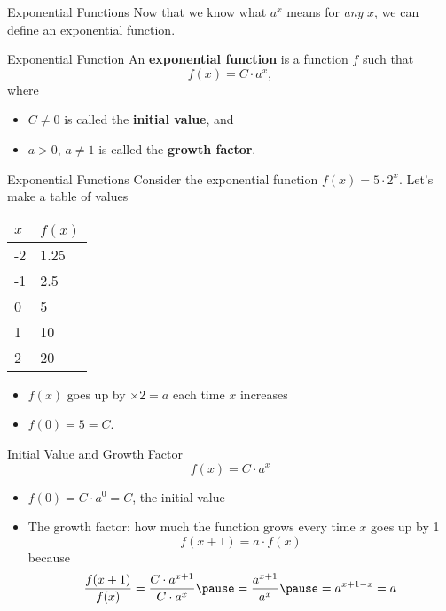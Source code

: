 \documentclass[]{beamer}
\begin{document}
	\begin{frame}{Exponential Functions}
		Now that we know what $a^x$ means for \textit{any} $x$, we can define an exponential function.
		\vfill
		\begin{block}{Exponential Function}
			An \textbf{exponential function} is a function $f$ such that
			\begin{equation*}
				f(x) = C \cdot a^x,
			\end{equation*}
			where
			\begin{itemize}
				\item $C \ne 0$ is called the \textbf{initial value}, and
				\item $a > 0$, $a \ne 1$ is called the \textbf{growth factor}.
			\end{itemize}
		\end{block}
	\end{frame}

	\begin{frame}{Exponential Functions}
		Consider the exponential function $f(x) = 5\cdot 2^x$. Let's make a table of values
		\vfill
		\begin{center}
		\begin{tabular}{@{}l|l@{}}
			$x$ & $f(x)$ \\
			\midrule
			-2 & 1.25 \\
			-1 & 2.5 \\
			0 & 5 \\
			1 & 10 \\
			2 & 20
		\end{tabular}
		\end{center}
		\vfill\pause
		\begin{itemize}
			\item $f(x)$ goes up by $\times 2 = a$ each time $x$ increases
			\vfill\pause
			\item $f(0) = 5 = C$.
		\end{itemize}
	\end{frame}
	
	\begin{frame}{Initial Value and Growth Factor}
		\begin{equation*}
			f(x) = C\cdot a^x
		\end{equation*}
		\vfill
		\begin{itemize}
			\item $f(0) = C\cdot a^0 = C$, the initial value
			\vfill\pause
			\item The growth factor: how much the function grows every time $x$ goes up by 1
			\begin{equation*}
				f(x+1) = a\cdot f(x)
			\end{equation*}
			\pause
			because
			\begin{equation*}
				\frac{f(x+1)}{f(x)} = \frac{C\cdot a^{x+1}}{C\cdot a^x} \pause = \frac{a^{x+1}}{a^x} \pause = a^{x+1-x} = a
			\end{equation*}
		\end{itemize}
	\end{frame}
\end{document}
